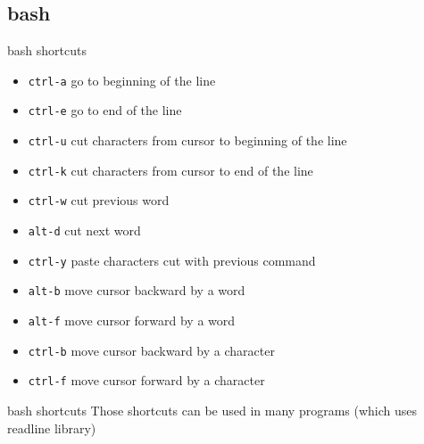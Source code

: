 \subsection{bash}

\begin{frame}[fragile]{bash shortcuts}
  \begin{itemize}
    \pause \item \texttt{ctrl-a} go to beginning of the line
    \pause \item \texttt{ctrl-e} go to end of the line
    \pause \item \texttt{ctrl-u} cut characters from cursor to beginning of the line
    \pause \item \texttt{ctrl-k} cut characters from cursor to end of the line
    \pause \item \texttt{ctrl-w} cut previous word
    \pause \item \texttt{alt-d} cut next word
    \pause \item \texttt{ctrl-y} paste characters cut with previous command
    \pause \item \texttt{alt-b} move cursor backward by a word
    \pause \item \texttt{alt-f} move cursor forward by a word
    \pause \item \texttt{ctrl-b} move cursor backward by a character
    \pause \item \texttt{ctrl-f} move cursor forward by a character
  \end{itemize}
\end{frame}

\begin{frame}[fragile]{bash shortcuts}
Those shortcuts can be used in many programs (which uses readline library)
\end{frame}

